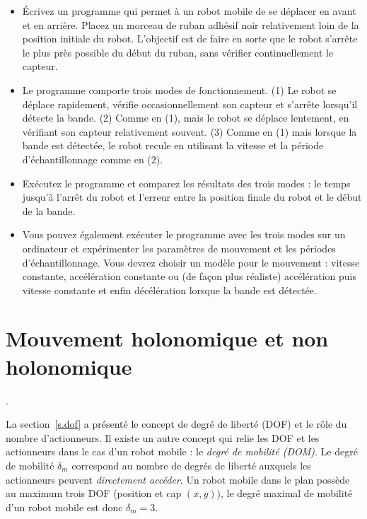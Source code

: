 {\begin{framed}
\begin{itemize}
\item Écrivez un programme qui permet à un robot mobile de se déplacer en avant et en arrière. Placez un morceau de ruban adhésif noir relativement loin de la position initiale du robot. L'objectif est de faire en sorte que le robot s'arrête le plus près possible du début du ruban, sans vérifier continuellement le capteur. 
\item Le programme comporte trois modes de fonctionnement. (1) Le robot se déplace rapidement, vérifie occasionnellement son capteur et s'arrête lorsqu'il détecte la bande. (2) Comme en (1), mais le robot se déplace lentement, en vérifiant son capteur relativement souvent. (3) Comme en (1) mais lorsque la bande est détectée, le robot recule en utilisant la vitesse et la période d'échantillonnage comme en (2).
\item Exécutez le programme et comparez les résultats des trois modes : le temps jusqu'à l'arrêt du robot et l'erreur entre la position finale du robot et le début de la bande.
\item Vous pouvez également exécuter le programme avec les trois modes sur un ordinateur et expérimenter les paramètres de mouvement et les périodes d'échantillonnage. Vous devrez choisir un modèle pour le mouvement : vitesse constante, accélération constante ou (de façon plus réaliste) accélération puis vitesse constante et enfin décélération lorsque la bande est détectée.
\end{itemize}
\end{framed}

\section{Mouvement holonomique et non holonomique}\label{s.holonomic}
.

La section~\ref{s.dof} a présenté le concept de degré de liberté (DOF) et le rôle du nombre d'actionneurs. Il existe un autre concept qui relie les DOF et les actionneurs dans le cas d'un robot mobile : le \emph{degré de mobilité (DOM)}. Le degré de mobilité $\delta_m$ correspond au nombre de degrés de liberté auxquels les actionneurs peuvent \emph{directement accéder}. Un robot mobile dans le plan possède au maximum trois DOF (position et cap $(x,y)$), le degré maximal de mobilité d'un robot mobile est donc $\delta_m = 3$.

}
